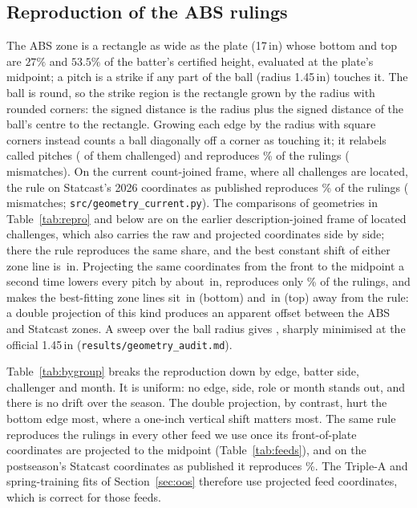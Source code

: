 \documentclass[aoas]{imsart}
\theoremstyle{plain}
\theoremstyle{definition}
\begin{document}
\subsection{Reproduction of the ABS rulings}
The ABS zone is a rectangle as wide as the plate (17\,in) whose bottom and top are $27\%$ and $53.5\%$ of the batter's
certified height, evaluated at the plate's midpoint; a pitch is a strike if any part of the ball (radius 1.45\,in)
touches it. The ball is round, so the strike region is the rectangle grown by the radius with rounded corners: the
signed distance is the radius plus the signed distance of the ball's centre to the rectangle. Growing each edge by the
radius with square corners instead counts a ball diagonally off a
corner as touching it; it relabels \GeomRelabelCalled{} called pitches (\GeomRelabelChallenged{} of them
challenged) and reproduces \GeomReproSquare\% of the rulings (\GeomMismatchSquare{} mismatches). On the current count-joined frame, where all \GeomN{} challenges are located, the rule on Statcast's 2026 coordinates as
published reproduces \GeomRepro\% of the rulings (\GeomMismatch{} mismatches; \texttt{src/geometry\_current.py}). The comparisons of geometries in Table~\ref{tab:repro} and below are on the earlier description-joined frame of \GeomNOld{} located challenges, which also carries the raw and projected coordinates side by side; there the rule reproduces the same share, and the best constant shift of either zone line is
\SRawShift\,in. Projecting the same coordinates from the front to the midpoint a second time lowers every pitch by about \GeomShiftOld\,in, reproduces only \GeomReproOld\% of the rulings, and
makes the best-fitting zone lines sit \SOldShiftBottom\,in (bottom) and \SOldShiftTop\,in (top) away from the rule:
a double projection of this kind produces an apparent offset between the ABS and Statcast zones. A sweep over the ball
radius gives \GeomRadiusSweep, sharply minimised at the official 1.45\,in (\texttt{results/geometry\_audit.md}).

\begin{table}[!htbp]
\caption{Share of the \GeomNOld{} challenge rulings of a description-based join reproduced by the published zone rule, by geometry.}\label{tab:repro}
\centering\small

\end{table}

Table~\ref{tab:bygroup} breaks the reproduction down by edge, batter side, challenger and month. It is uniform: no
edge, side, role or month stands out, and there is no drift over the season. The double projection, by contrast, hurt
the bottom edge most, where a one-inch vertical shift matters most. The same rule reproduces the rulings in every
other feed we use once its front-of-plate coordinates are projected to the midpoint (Table~\ref{tab:feeds}), and on
the postseason's Statcast coordinates as published it reproduces \SPostStatcastRepro\%. The Triple-A and
spring-training fits of Section~\ref{sec:oos} therefore use projected feed coordinates, which is correct for those
feeds.
\end{document}
